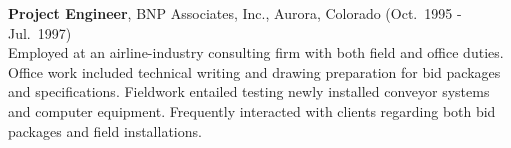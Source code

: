 \documentclass[11pt]{article}
\newlength{\sectionskip} \setlength{\sectionskip}{0.2in}
\newlength{\minipagewidth} \setlength{\minipagewidth}{6.25in} %
\newlength{\bulletminipagewidth} \setlength{\bulletminipagewidth}{6.05in} %
\begin{document}


\begin{minipage}{\minipagewidth}
\textbf{Project Engineer}, BNP Associates, Inc., Aurora, Colorado (Oct.~1995 - Jul.~1997) \\
%
Employed at an airline-industry consulting firm with both field and
office duties. Office work included technical writing and drawing
preparation for bid packages and specifications.  Fieldwork entailed
testing newly installed conveyor systems and computer
equipment. Frequently interacted with clients regarding both bid
packages and field installations.
\end{minipage}\vspace{\parskip}

%
%
\end{document}
